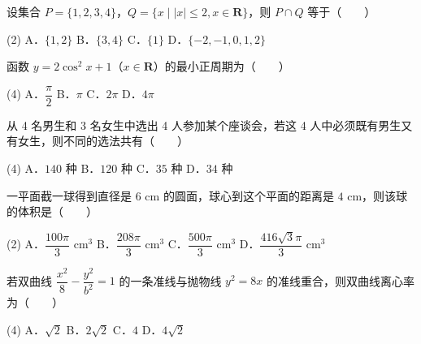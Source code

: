 

\begin{question}
设集合 $P = \{1, 2, 3, 4\}$，$Q = \{x \mid |x| \leqslant 2, x \in \mathbf{R} \}$，则 $P \cap Q$ 等于\mbox{（　　）}

\begin{gkopts}(2)
\task A．$\{1, 2\}$
\task B．$\{3, 4\}$
\task C．$\{1\}$
\task D．$\{-2, -1, 0, 1, 2\}$
\end{gkopts}

\end{question}
\begin{question}
函数 $y = 2\cos^2 x + 1$（$x \in \mathbf{R}$）的最小正周期为\mbox{（　　）}

\begin{gkopts}(4)
\task A．$\dfrac{\pi}{2}$
\task B．$\pi$
\task C．$2\pi$
\task D．$4\pi$
\end{gkopts}

\end{question}
\begin{question}
从 4 名男生和 3 名女生中选出 4 人参加某个座谈会，若这 4 人中必须既有男生又有女生，则不同的选法共有\mbox{（　　）}

\begin{gkopts}(4)
\task A．$140$ 种
\task B．$120$ 种
\task C．$35$ 种
\task D．$34$ 种
\end{gkopts}

\end{question}
\begin{question}
一平面截一球得到直径是 $6\text{ cm}$ 的圆面，球心到这个平面的距离是 $4\text{ cm}$，则该球的体积是\mbox{（　　）}

\begin{gkopts}(2)
\task A．$\dfrac{100\pi}{3}\text{ cm}^3$
\task B．$\dfrac{208\pi}{3}\text{ cm}^3$
\task C．$\dfrac{500\pi}{3}\text{ cm}^3$
\task D．$\dfrac{416\sqrt{3}\pi}{3}\text{ cm}^3$
\end{gkopts}

\end{question}
\begin{question}
若双曲线 $\dfrac{x^2}{8} - \dfrac{y^2}{b^2} = 1$ 的一条准线与抛物线 $y^2 = 8x$ 的准线重合，则双曲线离心率为\mbox{（　　）}

\begin{gkopts}(4)
\task A．$\sqrt{2}$
\task B．$2\sqrt{2}$
\task C．$4$
\task D．$4\sqrt{2}$
\end{gkopts}

\Needspace{0.4\textheight}
\end{question}
